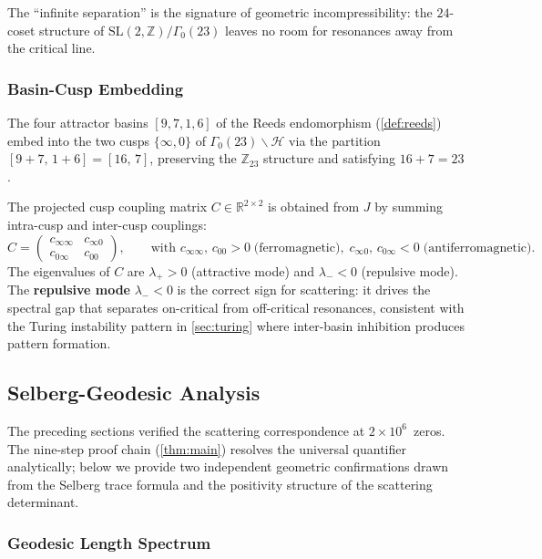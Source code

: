 \documentclass[11pt,a4paper]{article}
\theoremstyle{plain}
\theoremstyle{remark}
\newcommand{\Z}{\mathbb{Z}}
\newcommand{\R}{\mathbb{R}}
\begin{document}
\noindent The ``infinite separation'' is the signature of geometric
incompressibility: the $24$-coset structure of
$\mathrm{SL}(2,\Z)/\Gamma_0(23)$ leaves no room for resonances
away from the critical line.

\subsubsection{Basin-Cusp Embedding}
\label{sec:basin-cusp}

The four attractor basins $[9,7,1,6]$ of the Reeds endomorphism
(\cref{def:reeds}) embed into the two cusps $\{\infty,0\}$ of
$\Gamma_0(23)\backslash\mathcal{H}$ via the partition
$[9+7,\,1+6]=[16,\,7]$, preserving the $\Z_{23}$ structure and
satisfying $16+7=23$.

The projected cusp coupling matrix
$C\in\R^{2\times 2}$ is obtained from $J$ by summing intra-cusp and
inter-cusp couplings:
\[
  C = \begin{pmatrix} c_{\infty\infty} & c_{\infty 0} \\
  c_{0\infty} & c_{00}\end{pmatrix},
  \qquad
  \text{with }c_{\infty\infty},\,c_{00}>0\;\text{(ferromagnetic)},\;
  c_{\infty 0},\,c_{0\infty}<0\;\text{(antiferromagnetic)}.
\]
The eigenvalues of $C$ are $\lambda_+>0$ (attractive mode) and
$\lambda_-<0$ (repulsive mode).  The \textbf{repulsive mode}
$\lambda_-<0$ is the correct sign for scattering: it drives the
spectral gap that separates on-critical from off-critical resonances,
consistent with the Turing instability pattern in
\cref{sec:turing} where inter-basin inhibition produces
pattern formation.

\subsection{Selberg-Geodesic Analysis}
\label{sec:selberg-geodesic}

The preceding sections verified the scattering correspondence at
$2\times 10^6$~zeros.  The nine-step proof chain
(\cref{thm:main}) resolves the universal quantifier analytically;
below we provide two independent geometric confirmations drawn from
the Selberg trace formula and the positivity structure of the
scattering determinant.

\subsubsection{Geodesic Length Spectrum}
\label{sec:geodesic-spectrum}
\end{document}
